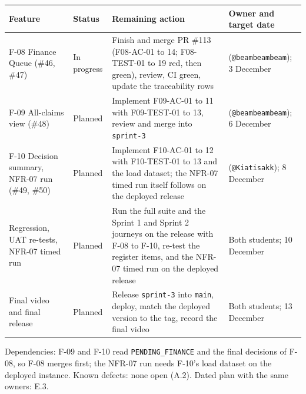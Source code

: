 \begin{center}\small\setlength{\tabcolsep}{4pt}
\begin{tabular}{@{}p{3.1cm}p{2.1cm}p{6.0cm}p{4.4cm}@{}}
\toprule \textbf{Feature} & \textbf{Status} & \textbf{Remaining action} & \textbf{Owner and target date} \\ \midrule
F-08 Finance Queue (\#46, \#47) & In progress & Finish and merge PR \#113 (F08-AC-01 to 14; F08-TEST-01 to 19 red, then green), review, CI green, update the traceability rows & \studentTwoName{} (\texttt{@beambeambeam}); 3 December \\
F-09 All-claims view (\#48) & Planned & Implement F09-AC-01 to 11 with F09-TEST-01 to 13, review and merge into \texttt{sprint-3} & \studentTwoName{} (\texttt{@beambeambeam}); 6 December \\
F-10 Decision summary, NFR-07 run (\#49, \#50) & Planned & Implement F10-AC-01 to 12 with F10-TEST-01 to 13 and the load dataset; the NFR-07 timed run itself follows on the deployed release & \studentOneName{} (\texttt{@Kiatisakk}); 8 December \\
Regression, UAT re-tests, NFR-07 timed run & Planned & Run the full suite and the Sprint 1 and Sprint 2 journeys on the release with F-08 to F-10, re-test the register items, and the NFR-07 timed run on the deployed release & Both students; 10 December \\
Final video and final release & Planned & Release \texttt{sprint-3} into \texttt{main}, deploy, match the deployed version to the tag, record the final video & Both students; 13 December \\
\bottomrule
\end{tabular}
\end{center}

\noindent Dependencies: F-09 and F-10 read \texttt{PENDING\_FINANCE} and the final decisions of F-08, so F-08 merges first; the NFR-07 run needs F-10's load dataset on the deployed instance. Known defects: none open (A.2). Dated plan with the same owners: E.3.
